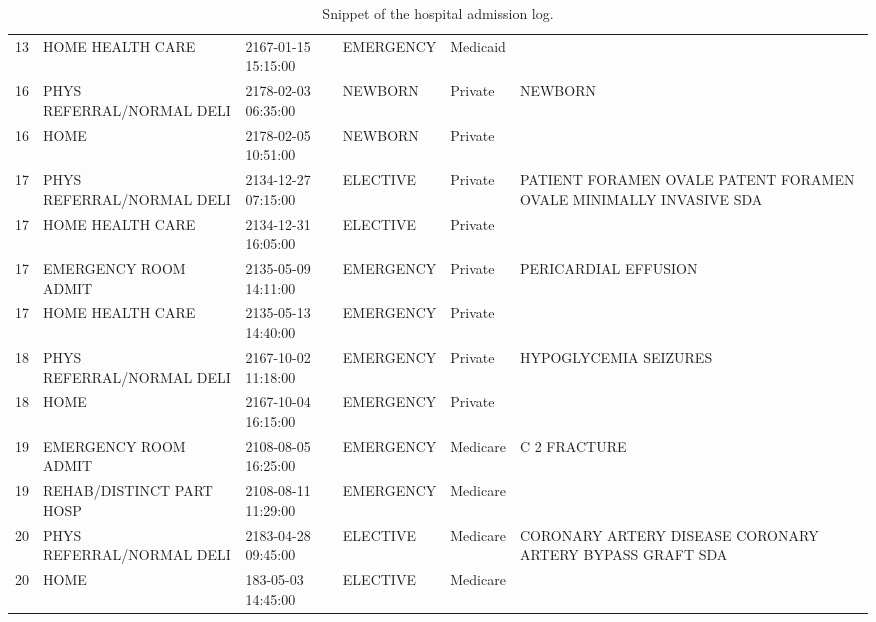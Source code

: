 \begin{appendices}
\begin{table}[!h]
\begin{tabularx}{\textwidth}{lllllp{3.6cm}}
13&HOME HEALTH CARE&2167-01-15 15:15:00&EMERGENCY&Medicaid&\\
16&PHYS REFERRAL/NORMAL DELI&2178-02-03 06:35:00&NEWBORN&Private&NEWBORN\\
16&HOME&2178-02-05 10:51:00&NEWBORN&Private&\\
17&PHYS REFERRAL/NORMAL DELI&2134-12-27 07:15:00&ELECTIVE&Private&PATIENT FORAMEN OVALE PATENT FORAMEN OVALE MINIMALLY INVASIVE SDA\\
17&HOME HEALTH CARE&2134-12-31 16:05:00&ELECTIVE&Private&\\
17&EMERGENCY ROOM ADMIT&2135-05-09 14:11:00&EMERGENCY&Private&PERICARDIAL EFFUSION\\
17&HOME HEALTH CARE&2135-05-13 14:40:00&EMERGENCY&Private&\\
18&PHYS REFERRAL/NORMAL DELI&2167-10-02 11:18:00&EMERGENCY&Private&HYPOGLYCEMIA SEIZURES\\
18&HOME&2167-10-04 16:15:00&EMERGENCY&Private&\\
19&EMERGENCY ROOM ADMIT&2108-08-05 16:25:00&EMERGENCY&Medicare&C 2 FRACTURE\\
19&REHAB/DISTINCT PART HOSP&2108-08-11 11:29:00&EMERGENCY&Medicare&\\
20&PHYS REFERRAL/NORMAL DELI&2183-04-28 09:45:00&ELECTIVE&Medicare&CORONARY ARTERY DISEASE CORONARY ARTERY BYPASS GRAFT SDA\\
20&HOME&183-05-03 14:45:00&ELECTIVE&Medicare&\\
		\bottomrule
	\end{tabularx}
	\caption[Snippet of the hospital admission log]{Snippet of the hospital admission log.}
\end{table}

\end{appendices}